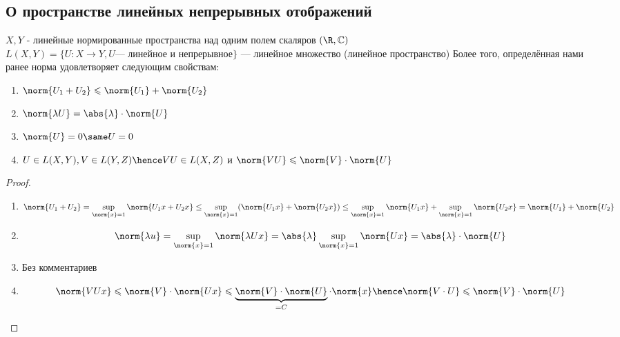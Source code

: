 \subsection{О пространстве линейных непрерывных отображений}
\begin{theorem}
    $X, Y$ - линейные нормированные пространства над одним полем скаляров $(\R, \mathbb{C})$ \\ 
    $L(X, Y) = \{ U : X \to Y, U \text{--- линейное и непрерывное} \}$ --- линейное множество (линейное пространство)
    Более того, определённая нами ранее норма удовлетворяет следующим свойствам:
    \begin{enumerate}
        \item $\norm{U_1 + U_2} \leqslant \norm{U_1} + \norm{U_2}$
        \item $\norm{\lambda U} = \abs{\lambda} \cdot \norm{U}$
        \item $\norm{U} = 0 \same U = 0$
        \item $U \in L(X, Y), V \in L(Y, Z) \hence VU \in L(X, Z)$ и $\norm{VU} \leqslant \norm{V} \cdot \norm{U}$
    \end{enumerate}
\end{theorem}



\begin{proof}
   \begin{enumerate}
       \item 
       \[
           \norm{U_1 + U_2} = \sup_{\norm{x} = 1}\norm{U_1x + U_2x} \le
           \sup_{\norm{x}=1}(\norm{U_1 x} + \norm{U_2 x}) \le
           \sup_{\norm{x}=1}\norm{U_1 x} + \sup_{\norm{x} = 1}\norm{U_2 x} = \norm{U_1} + \norm{U_2}
       \]
       \item \[
           \norm{\lambda u} = \sup_{\norm{x} = 1} {\norm{\lambda Ux}} = \abs{\lambda} \sup_{\norm{x} = 1}{\norm{Ux}} = \abs{\lambda} \cdot \norm{U}
       \]

       \item Без комментариев
       
       \item \[
           \norm{VUx} \leqslant \norm{V} \cdot \norm{Ux} \leqslant \underbrace{\norm{V} \cdot \norm{U} }_{ = C}  \cdot \norm{x} \hence \norm{V \cdot U} \leqslant \norm{V} \cdot \norm{U}
       \]
   \end{enumerate} 
        

\end{proof}



